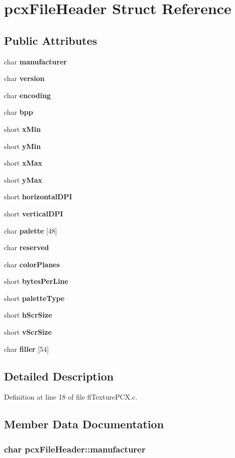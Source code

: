 \section{pcx\-File\-Header Struct Reference}
\label{structpcxFileHeader}
\subsection*{Public Attributes}
\begin{CompactItemize}
\item 
char {\bf manufacturer}
\item 
char {\bf version}
\item 
char {\bf encoding}
\item 
char {\bf bpp}
\item 
short {\bf x\-Min}
\item 
short {\bf y\-Min}
\item 
short {\bf x\-Max}
\item 
short {\bf y\-Max}
\item 
short {\bf horizontal\-DPI}
\item 
short {\bf vertical\-DPI}
\item 
char {\bf palette} [48]
\item 
char {\bf reserved}
\item 
char {\bf color\-Planes}
\item 
short {\bf bytes\-Per\-Line}
\item 
short {\bf palette\-Type}
\item 
short {\bf h\-Scr\-Size}
\item 
short {\bf v\-Scr\-Size}
\item 
char {\bf filler} [54]
\end{CompactItemize}


\subsection{Detailed Description}




Definition at line 18 of file fl\-Texture\-PCX.c.

\subsection{Member Data Documentation}
\subsubsection{\setlength{\rightskip}{0pt plus 5cm}char {\bf pcx\-File\-Header::manufacturer}}\label{structpcxFileHeader_f65b6d4d114fce1707a8ddbf7ba1c59b}




